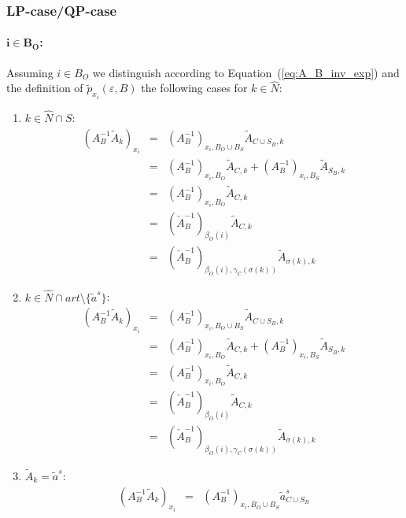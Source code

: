 \documentclass[a4paper]{article}
\begin{document}
\subsubsection{LP-case/QP-case}
\paragraph{$\mathbf{i \in B_{O}}$:}
Assuming $i \in B_{O}$ we distinguish
according to Equation~(\ref{eq:A_B_inv_exp})
and the definition of $\tilde{p}_{x_{i}}(\varepsilon, B)$ the
following cases for $k \in \hat{N}$:
\begin{enumerate}
\item $k \in \hat{N} \cap S$:
\begin{eqnarray}
 (A_{B}^{-1}\tilde{A}_{k})_{x_{i}} &=&
  (A_{B}^{-1})_{x_{i}, B_{O} \cup B_{S}}\tilde{A}_{C \cup S_{B}, k}
  \nonumber \\
  &=&
  (A_{B}^{-1})_{x_{i}, B_{O}}\tilde{A}_{C, k} +
  (A_{B}^{-1})_{x_{i}, B_{S}}\tilde{A}_{S_{B}, k} 
  \nonumber \\
  &=&  
  (A_{B}^{-1})_{x_{i}, B_{O}}\tilde{A}_{C, k} 
  \nonumber \\
  &=&
  \left(\check{A}_{B}^{-1}\right)_{\beta_{O}(i)}\tilde{A}_{C, k}
  \nonumber \\
  &=&
  \left(\check{A}_{B}^{-1}\right)_{\beta_{O}(i), \gamma_{C}(\sigma(k))}
  \tilde{A}_{\sigma(k), k}
\end{eqnarray}
\item $k \in \hat{N} \cap art \setminus \{\tilde{a}^{s}\}$:
\begin{eqnarray}
  (A_{B}^{-1}\tilde{A}_{k})_{x_{i}} &=&
  (A_{B}^{-1})_{x_{i}, B_{O} \cup B_{S}}\tilde{A}_{C \cup S_{B}, k}
  \nonumber \\
  &=&
  (A_{B}^{-1})_{x_{i}, B_{O}}\tilde{A}_{C, k} +
  (A_{B}^{-1})_{x_{i}, B_{S}}\tilde{A}_{S_{B}, k} 
  \nonumber \\ 
  &=&
  (A_{B}^{-1})_{x_{i}, B_{O}}\tilde{A}_{C, k} 
  \nonumber \\ 
  &=&
  \left(\check{A}_{B}^{-1}\right)_{\beta_{O}(i)}\tilde{A}_{C, k}
  \nonumber \\
  &=&
  \left(\check{A}_{B}^{-1}\right)_{\beta_{O}(i), \gamma_{C}(\sigma(k))}
  \tilde{A}_{\sigma(k), k}    
\end{eqnarray}
\item $\tilde{A}_{k}=\tilde{a}^{s}$:
\begin{eqnarray}
  (A_{B}^{-1}\tilde{A}_{k})_{x_{i}} &=& 
  (A_{B}^{-1})_{x_{i}, B_{O} \cup B_{S}} \tilde{a}_{C \cup S_{B}}^{s}
  \nonumber \\

\end{eqnarray}
\end{enumerate}
\end{document}
